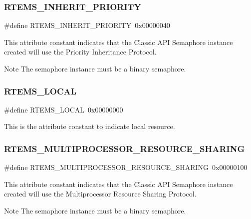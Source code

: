 \subsubsection{\texorpdfstring{RTEMS\_INHERIT\_PRIORITY}{RTEMS\_INHERIT\_PRIORITY}}
{\footnotesize\ttfamily \#define R\+T\+E\+M\+S\+\_\+\+I\+N\+H\+E\+R\+I\+T\+\_\+\+P\+R\+I\+O\+R\+I\+TY~0x00000040}

This attribute constant indicates that the Classic A\+PI Semaphore instance created will use the Priority Inheritance Protocol.

\begin{DoxyNote}{Note}
The semaphore instance must be a binary semaphore. 
\end{DoxyNote}
\mbox{\label{group__ClassicAttributes_ga12f6eed44135cc4b948bb03f01c97b27}} 
\subsubsection{\texorpdfstring{RTEMS\_LOCAL}{RTEMS\_LOCAL}}
{\footnotesize\ttfamily \#define R\+T\+E\+M\+S\+\_\+\+L\+O\+C\+AL~0x00000000}

This is the attribute constant to indicate local resource. \mbox{\label{group__ClassicAttributes_ga6c70b7ca8adb4f3588ebe1ae7bd9cfce}} 
\subsubsection{\texorpdfstring{RTEMS\_MULTIPROCESSOR\_RESOURCE\_SHARING}{RTEMS\_MULTIPROCESSOR\_RESOURCE\_SHARING}}
{\footnotesize\ttfamily \#define R\+T\+E\+M\+S\+\_\+\+M\+U\+L\+T\+I\+P\+R\+O\+C\+E\+S\+S\+O\+R\+\_\+\+R\+E\+S\+O\+U\+R\+C\+E\+\_\+\+S\+H\+A\+R\+I\+NG~0x00000100}

This attribute constant indicates that the Classic A\+PI Semaphore instance created will use the Multiprocessor Resource Sharing Protocol.

\begin{DoxyNote}{Note}
The semaphore instance must be a binary semaphore. 
\end{DoxyNote}
\mbox{\label{group__ClassicAttributes_ga514fb0bc840344fb4b221b646a30f5c2}} 
